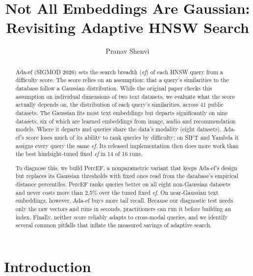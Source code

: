 \documentclass[sigconf,review=false,screen]{acmart}
\newcommand{\pending}[1]{\textcolor{red}{[#1]}}
\newcommand{\ef}{\textit{ef}}
\begin{document}
\title{Not All Embeddings Are Gaussian: Revisiting Adaptive HNSW Search}

\author{Pranav Shenvi}
\affiliation{\institution{\pending{affiliation}}\country{India}}

\begin{abstract}
Ada-ef (SIGMOD 2026) sets the search breadth (\ef{}) of each HNSW query from a difficulty score.
The score relies on an assumption: that a query's similarities to the database follow a Gaussian
distribution. While the original paper checks this assumption on individual dimensions of two text
datasets, we evaluate what the score actually depends on, the distribution of each query's
similarities, across 41 public datasets. The Gaussian fits most text embeddings but departs
significantly on nine datasets, six of which are learned embeddings from image, audio and
recommendation models. Where it departs and queries share the data's modality (eight datasets),
Ada-ef's score loses much of its ability to rank queries by difficulty; on SIFT and Yambda it
assigns every query the same \ef{}. Its released implementation then does more work than the best
hindsight-tuned fixed \ef{} in 14 of 16 runs.

To diagnose this, we build PercEF, a nonparametric variant that keeps Ada-ef's design but replaces
its Gaussian thresholds with fixed ones read from the database's empirical distance percentiles.
PercEF ranks queries better on all eight non-Gaussian datasets and never costs more than 2.5\% over
the tuned fixed \ef{}. On near-Gaussian text embeddings, however, Ada-ef buys more tail recall.
Because our diagnostic test needs only the raw vectors and runs in seconds, practitioners can run it
before building an index. Finally, neither score reliably adapts to cross-modal queries, and we
identify several common pitfalls that inflate the measured savings of adaptive search.
\end{abstract}

\maketitle
\pagestyle{plain}   %

\section{Introduction}
\end{document}
